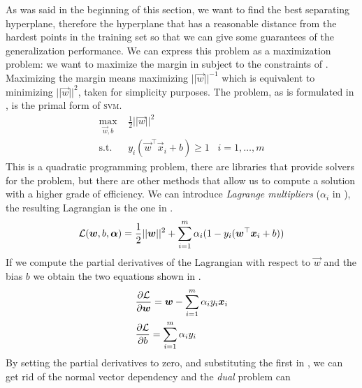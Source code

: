 As was said in the beginning of this section, we want to find the best separating hyperplane,
therefore the hyperplane that has a reasonable distance from the hardest points in the training set
so that we can give some guarantees of the generalization performance. We can express this problem as a maximization problem:
we want to maximize the margin in  subject to the constraints of
. Maximizing the margin means maximizing $||\vec{w}||^{-1}$ which is equivalent
to minimizing $||\vec{w}||^2$, taken for simplicity purposes. The problem, as is formulated in
, is the primal form of \textsc{svm}.
\begin{equation}
	\label{eq:primal}
	\begin{aligned}
		\max_{\vec{w}, b}        & \frac{1}{2}||\vec{w}||^2                                            \\
		\text{s.t.}\hspace{10pt} & y_i(\vec{w}^\top\vec{x}_i + b) \geq 1 \hspace{10pt}i = 1, \ldots, m
	\end{aligned}
\end{equation}
This is a quadratic programming problem, there are libraries that provide solvers for the problem,
but there are other methods that allow us to compute a solution with a higher grade of efficiency.
We can introduce \emph{Lagrange multipliers} ($\alpha_i$ in ), the resulting
Lagrangian is the one in .
\begin{equation}
	\label{eq:lagrangian}
	\mathcal{L}(\boldsymbol{w}, b, \boldsymbol{\alpha}) = \frac{1}{2} ||\boldsymbol{w}||^2 + \sum_{i = 1}^{m}{\alpha_i (1 - y_i(\boldsymbol{w}^\top\boldsymbol{x}_i + b))}
\end{equation}
If we compute the partial derivatives of the Lagrangian with respect to $\vec{w}$ and the bias $b$
we obtain the two equations shown in .
\begin{equation}
	\label{eq:pd-lagrangian}
	\begin{aligned}
		 & \frac{\partial{\mathcal{L}}}{\partial{\boldsymbol{w}}} = \boldsymbol{w} - \sum_{i = 1}^m
		\alpha_iy_i\boldsymbol{x}_i                                                   \\
		 & \frac{\partial{\mathcal{L}}}{\partial{b}} = \sum_{i = 1}^m \alpha_iy_i
	\end{aligned}
\end{equation}
By setting the partial derivatives to zero, and substituting the first in
, we can get rid of the normal vector dependency and the \emph{dual} problem can
